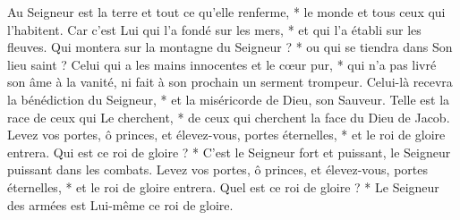 Au Seigneur est la terre et tout ce qu'elle renferme, * le monde et tous ceux qui l'habitent.
\versseparator
Car c'est Lui qui l'a fondé sur les mers, * et qui l'a établi sur les fleuves.
\versseparator
Qui montera sur la montagne du Seigneur ? * ou qui se tiendra dans Son lieu saint ?
\versseparator
Celui qui a les mains innocentes et le cœur pur, * qui n'a pas livré son âme à la vanité, ni fait à son prochain un serment trompeur.
\versseparator
Celui-là recevra la bénédiction du Seigneur, * et la miséricorde de Dieu, son Sauveur.
\versseparator
Telle est la race de ceux qui Le cherchent, * de ceux qui cherchent la face du Dieu de Jacob.
\versseparator
Levez vos portes, ô princes, et élevez-vous, portes éternelles, * et le roi de gloire entrera.
\versseparator
Qui est ce roi de gloire ? * C'est le Seigneur fort et puissant, le Seigneur puissant dans les combats.
\versseparator
Levez vos portes, ô princes, et élevez-vous, portes éternelles, * et le roi de gloire entrera.
\versseparator
Quel est ce roi de gloire ? * Le Seigneur des armées est Lui-même ce roi de gloire.